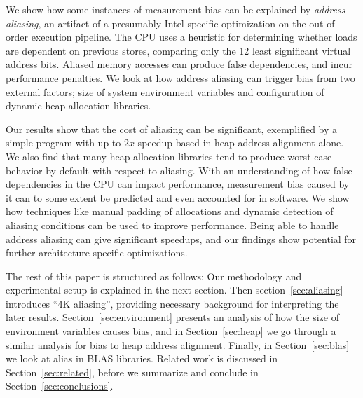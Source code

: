 \documentclass[10pt, conference, compsocconf]{IEEEtran}
\begin{document}
We show how some instances of measurement bias can be explained by \emph{address aliasing}, an artifact of a presumably Intel specific optimization on the out-of-order execution pipeline.
The CPU uses a heuristic for determining whether loads are dependent on previous stores, comparing only the 12 least significant virtual address bits.
Aliased memory accesses can produce false dependencies, and incur performance penalties.
We look at how address aliasing can trigger bias from two external factors; size of system environment variables and configuration of dynamic heap allocation libraries.

Our results show that the cost of aliasing can be significant, exemplified by a simple program with up to $2x$ speedup based in heap address alignment alone.
We also find that many heap allocation libraries tend to produce worst case behavior by default with respect to aliasing.%
With an understanding of how false dependencies in the CPU can impact performance, measurement bias caused by it can to some extent be predicted and even accounted for in software.
We show how techniques like manual padding of allocations and dynamic detection of aliasing conditions can be used to improve performance. 
Being able to handle address aliasing can give significant speedups, and our findings show potential for further architecture-specific optimizations.

The rest of this paper is structured as follows: Our methodology and experimental setup is explained in the next section.
Then section~\ref{sec:aliasing} introduces ``4K aliasing'', providing necessary background for interpreting the later results.
Section~\ref{sec:environment} presents an analysis of how the size of environment variables causes bias, and in Section~\ref{sec:heap} we go through a similar analysis for bias to heap address alignment.
Finally, in Section~\ref{sec:blas} we look at alias in BLAS libraries.
Related work is discussed in Section~\ref{sec:related}, before we summarize and conclude in Section~\ref{sec:conclusions}.
\end{document}
